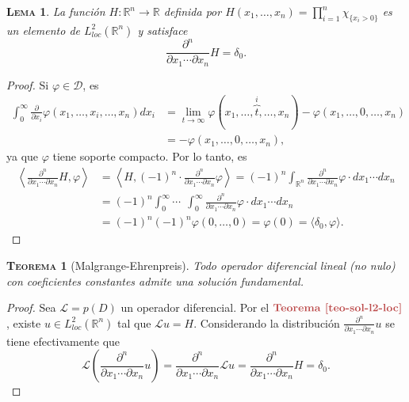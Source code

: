 \documentclass[11pt]{article}
\theoremstyle{colored}
\newtheorem{theorem}{\scshape Teorema}
\newtheorem{lemma}{\scshape Lema}
\newcommand{\R}{\mathbb{R}}
\newcommand{\test}{\mathscr{D}}
\newcommand{\ev}[1]{\langle #1 \rangle}
\renewcommand{\L}{\mathscr{L}}
\newcommand{\paint}[1]{\color{color}{#1}}
\newcommand{\tpaint}[1]{\paint{\textbf{#1}}}
\begin{document}
\begin{lemma} La función $H : \R^n \to \R$ definida por $H(x_1,\dots, x_n) = \prod_{i=1}^n \chi_{\{x_i > 0\}}$ es un elemento de $L_{loc}^2(\R^n)$ y satisface
\[
\frac{\partial^n}{\partial x_1 \cdots \partial x_n} H = \delta_0.
\]
\end{lemma}
\begin{proof} Si $\varphi \in \test$, es
\begin{align*}
\int_0^\infty \frac{\partial}{\partial x_i}\varphi(x_1,\dots, x_i,\dots,x_n)dx_i &= \lim_{t \to \infty} \varphi(x_1,\dots,\overbrace{t}^i,\dots,x_n) - \varphi(x_1, \dots,0,\dots,x_n)\\
& = - \varphi(x_1, \dots,0,\dots,x_n),
\end{align*}
ya que $\varphi$ tiene soporte compacto. Por lo tanto, es
\begin{align*}
\left\ev{\frac{\partial^n}{\partial x_1 \cdots \partial x_n} H,\varphi\right} &= \left\ev{H,(-1)^n \cdot \frac{\partial^n}{\partial x_1 \cdots \partial x_n}\varphi\right} = (-1)^n\int_{\R^n}\frac{\partial^n}{\partial x_1 \cdots \partial x_n}\varphi \cdot dx_1 \cdots dx_n\\
&= (-1)^n\int_0^\infty \cdots \ \ \int_0^\infty\frac{\partial^n}{\partial x_1 \cdots \partial x_n}\varphi \cdot dx_1 \cdots dx_n\\ &= (-1)^n(-1)^n\varphi(0,\dots,0) = \varphi(0) = \ev{\delta_0,\varphi}.
\end{align*}
\end{proof}

\begin{theorem}[Malgrange-Ehrenpreis] Todo operador diferencial lineal (no nulo) con coeficientes constantes  admite una solución fundamental.
\end{theorem}
\begin{proof} Sea $\L = p(D)$ un operador diferencial. Por el $\tpaint{Teorema \ref{teo-sol-l2-loc}}$, existe $u \in L^2_{loc}(\R^n)$ tal que $\L u = H$. Considerando la distribución $\frac{\partial^n}{\partial x_1 \cdots \partial x_n} u$ se tiene efectivamente que
\[
\L \left(\frac{\partial^n}{\partial x_1 \cdots \partial x_n} u\right) = \frac{\partial^n}{\partial x_1 \cdots \partial x_n} \L u = \frac{\partial^n}{\partial x_1 \cdots \partial x_n} H = \delta_0.
\]
\end{proof}
\end{document}
